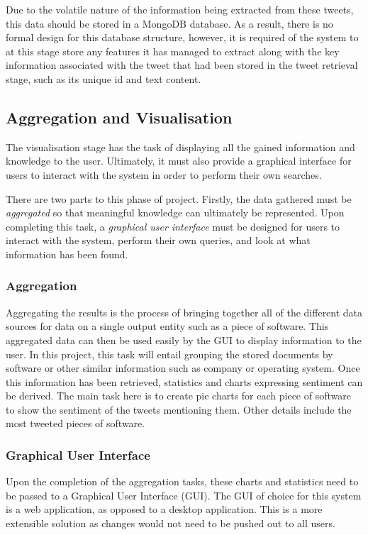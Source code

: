 Due to the volatile nature of the information being extracted from these tweets, this data should be stored in a MongoDB database. As a result, there is no formal design for this database structure, however, it is required of the system to at this stage store any features it has managed to extract along with the key information associated with the tweet that had been stored in the tweet retrieval stage, such as its unique id and text content.

\subsection{Aggregation and Visualisation}
\label{sec:arc3}
The visualisation stage has the task of displaying all the gained information and knowledge to the user. Ultimately, it must also provide a graphical interface for users to interact with the system in order to perform their own searches.

There are two parts to this phase of project. Firstly, the data gathered must be \emph{aggregated} so that meaningful knowledge can ultimately be represented. Upon completing this task, a \emph{graphical user interface} must be designed for users to interact with the system, perform their own queries, and look at what information has been found.

\subsubsection{Aggregation}
Aggregating the results is the process of bringing together all of the different data sources for data on a single output entity such as a piece of software. This aggregated data can then be used easily by the GUI to display information to the user. In this project, this task will entail grouping the stored documents by software or other similar information such as company or operating system. Once this information has been retrieved, statistics and charts expressing sentiment can be derived. The main task here is to create pie charts for each piece of software to show the sentiment of the tweets mentioning them. Other details include the most tweeted pieces of software.

\subsubsection{Graphical User Interface}
\label{sec:guid}
Upon the completion of the aggregation tasks, these charts and statistics need to be passed to a Graphical User Interface (GUI). The GUI of choice for this system is a web application, as opposed to a desktop application. This is a more extensible solution as changes would not need to be pushed out to all users.


